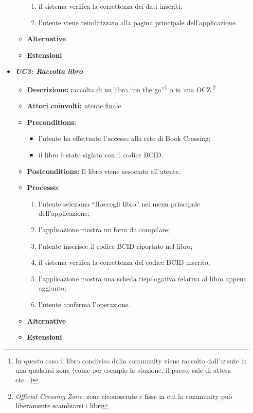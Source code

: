 \begin{itemize}
\begin{itemize}
\begin{enumerate}
			\item il sistema verifica la correttezza dei dati inseriti;
			\item l’utente viene reindirizzato alla pagina principale dell’applicazione.
		\end{enumerate}
		\item \textbf{Alternative}
		\item \textbf{Estensioni}
	\end{itemize}
	\item \textit{\textbf{UC3: Raccolta libro}}
	\begin{itemize}
		\item \textbf{Descrizione:} raccolta di un libro “on the go”\footnote{In questo caso il libro condiviso dalla community viene raccolto dall'utente in una qualsiasi zona (come per esempio la stazione, il parco, sale di attesa etc...)} o in una OCZ.\footnote{\textit{Official Crossing Zone}: zone riconosciute e fisse in cui la community può liberamente scambiarsi i libri}
		\item \textbf{Attori coinvolti:} utente finale.
		\item \textbf{Preconditions:}
		\begin{itemize}
			\item l’utente ha effettuato l’accesso alla rete di Book Crossing;
			\item il libro è stato siglato con il codice BCID.
		\end{itemize}
		\item \textbf{Postconditions:} Il libro viene associato all’utente.
		\item \textbf{Processo:}
		\begin{enumerate}
			\item l’utente seleziona “Raccogli libro” nel menu principale dell’applicazione;
			\item l’applicazione mostra un form da compilare;
			\item l’utente inserisce il codice BCID riportato nel libro;
			\item il sistema verifica la correttezza del codice BCID inserito;
			\item l’applicazione mostra una scheda riepilogativa relativa al libro appena aggiunto;
			\item  l’utente conferma l’operazione.
		\end{enumerate}
		\item \textbf{Alternative}
		\item \textbf{Estensioni}
	\end{itemize}

\end{itemize}
